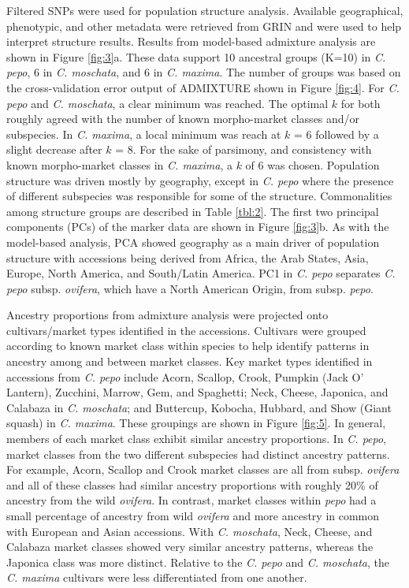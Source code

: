 \documentclass[utf8]{FrontiersinHarvard} %
\begin{document}
Filtered SNPs were used for population structure analysis. Available geographical, phenotypic, and other metadata were retrieved from GRIN and were used to help interpret structure results. Results from model-based admixture analysis are shown in Figure \ref{fig:3}a. These data support 10 ancestral groups (K=10) in \textit{C. pepo}, 6 in \textit{C. moschata}, and 6 in \textit{C. maxima}. The number of groups was based on the cross-validation error output of ADMIXTURE shown in Figure \ref{fig:4}. For \textit{C. pepo} and \textit{C. moschata}, a clear minimum was reached. The optimal $k$ for both roughly agreed with the number of known morpho-market classes and/or subspecies. In \textit{C. maxima}, a local minimum was reach at $k$ = 6 followed by a slight decrease after $k$ = 8. For the sake of parsimony, and consistency with known morpho-market classes in \textit{C. maxima}, a $k$ of 6 was chosen.  Population structure was driven mostly by geography, except in \textit{C. pepo} where the presence of different subspecies was responsible for some of the structure. Commonalities among structure groups are described in Table \ref{tbl:2}. The first two principal components (PCs) of the marker data are shown in Figure \ref{fig:3}b. As with the model-based analysis, PCA showed geography as a main driver of population structure with accessions being derived from Africa, the Arab States, Asia, Europe, North America, and South/Latin America. PC1 in \textit{C. pepo} separates \textit{C. pepo} subsp. \textit{ovifera}, which have a North American Origin, from subsp. \textit{pepo}.

Ancestry proportions from admixture analysis were projected onto cultivars/market types identified in the accessions. Cultivars were grouped according to known market class within species to help identify patterns in ancestry among and between market classes. Key market types identified in accessions from \textit{C. pepo} include Acorn, Scallop, Crook, Pumpkin (Jack O’ Lantern), Zucchini, Marrow, Gem, and Spaghetti; Neck, Cheese, Japonica, and Calabaza in \textit{C. moschata}; and Buttercup, Kobocha, Hubbard, and Show (Giant squash) in \textit{C. maxima}. These groupings are shown in Figure \ref{fig:5}. In general, members of each market class exhibit similar ancestry proportions. In \textit{C. pepo}, market classes from the two different subspecies had distinct ancestry patterns. For example, Acorn, Scallop and Crook market classes are all from subsp. \textit{ovifera} and all of these classes had similar ancestry proportions with roughly 20\% of ancestry from the wild \textit{ovifera}. In contrast, market classes within \textit{pepo} had a small percentage of ancestry from wild \textit{ovifera} and more ancestry in common with European and Asian accessions. With \textit{C. moschata}, Neck, Cheese, and Calabaza market classes showed very similar ancestry patterns, whereas the Japonica class was more distinct. Relative to the \textit{C. pepo} and \textit{C. moschata}, the \textit{C. maxima} cultivars were less differentiated from one another.
\end{document}

